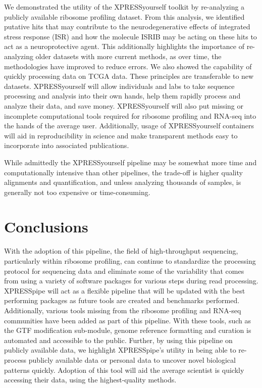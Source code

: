 \documentclass[11pt, a4paper, oneside]{article}
\begin{document}
We demonstrated the utility of the XPRESSyourself toolkit by re-analyzing a publicly available ribosome profiling dataset. From this analysis, we identified putative hits that may contribute to the neurodegenerative effects of integrated stress response (ISR) and how the molecule ISRIB may be acting on these hits to act as a neuroprotective agent. This additionally highlights the importance of re-analyzing older datasets with more current methods, as over time, the methodologies have improved to reduce errors. We also showed the capability of quickly processing data on TCGA data. These principles are transferable to new datasets. XPRESSyourself will allow individuals and labs to take sequence processing and analysis into their own hands, help them rapidly process and analyze their data, and save money. XPRESSyourself will also put missing or incomplete computational tools required for ribosome profiling and RNA-seq into the hands of the average user. Additionally, usage of XPRESSyourself containers will aid in reproducibility in science and make transparent methods easy to incorporate into associated publications. \par

While admittedly the XPRESSyourself pipeline may be somewhat more time and computationally intensive than other pipelines, the trade-off is higher quality alignments and quantification, and unless analyzing thousands of samples, is generally not too expensive or time-consuming.


\section{Conclusions}
With the adoption of this pipeline, the field of high-throughput sequencing, particularly within ribosome profiling, can continue to standardize the processing protocol for sequencing data and eliminate some of the variability that comes from using a variety of software packages for various steps during read processing. XPRESSpipe will act as a flexible pipeline that will be updated with the best performing packages as future tools are created and benchmarks performed. Additionally, various tools missing from the ribosome profiling and RNA-seq communities have been added as part of this pipeline. With these tools, such as the GTF modification sub-module, genome reference formatting and curation is automated and accessible to the public. Further, by using this pipeline on publicly available data, we highlight XPRESSpipe's utility in being able to re-process publicly available data or personal data to uncover novel biological patterns quickly. Adoption of this tool will aid the average scientist is quickly accessing their data, using the highest-quality methods.
\end{document}
